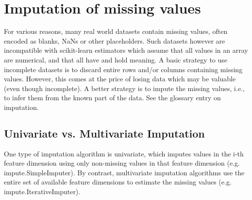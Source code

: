 \chapter{Imputation of missing values}
For various reasons, many real world datasets contain missing values, often encoded as blanks, NaNs or other placeholders. Such datasets however are incompatible with scikit-learn estimators which assume that all values in an array are numerical, and that all have and hold meaning. A basic strategy to use incomplete datasets is to discard entire rows and/or columns containing missing values. However, this comes at the price of losing data which may be valuable (even though incomplete). A better strategy is to impute the missing values, i.e., to infer them from the known part of the data. See the glossary entry on imputation.
\section{Univariate vs. Multivariate Imputation}
One type of imputation algorithm is univariate, which imputes values in the i-th feature dimension using only non-missing values in that feature dimension (e.g. impute.SimpleImputer). By contrast, multivariate imputation algorithms use the entire set of available feature dimensions to estimate the missing values (e.g. impute.IterativeImputer).